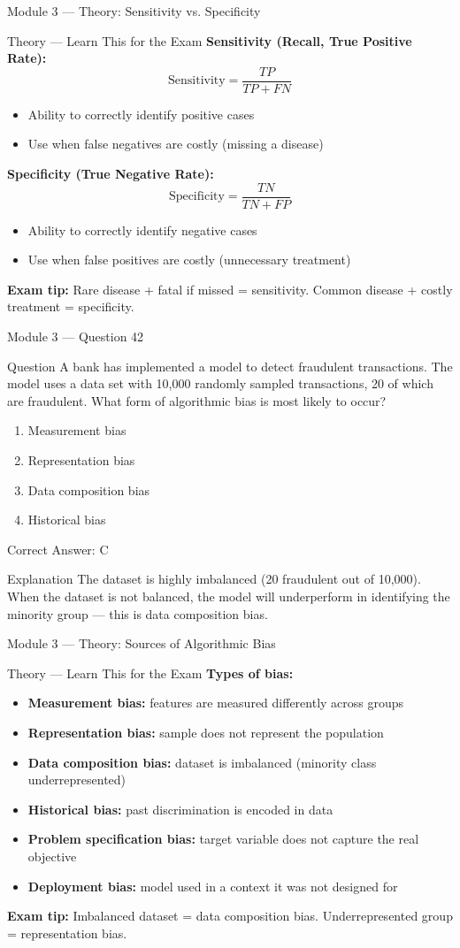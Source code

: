 \documentclass[aspectratio=169,10pt]{beamer}
\newcommand{\question}[1]{%
	\begin{block}{Question}
		#1
	\end{block}
}
\newcommand{\options}[4]{%
	\begin{enumerate}[label=\Alph*.,leftmargin=*]
		\item #1
		\item #2
		\item #3
		\item #4
	\end{enumerate}
}
\newcommand{\answerbox}[1]{%
	\begin{exampleblock}{Correct Answer: #1}
	\end{exampleblock}
}
\newcommand{\explain}[1]{%
	\begin{block}{Explanation}
		\small #1
	\end{block}
}
\newcommand{\theory}[1]{%
	\begin{block}{Theory --- Learn This for the Exam}
		\small #1
	\end{block}
}
\begin{document}
	\begin{frame}{Module 3 --- Theory: Sensitivity vs. Specificity}
		\theory{
			\textbf{Sensitivity (Recall, True Positive Rate):}
			\[
			\text{Sensitivity} = \frac{TP}{TP + FN}
			\]
			\begin{itemize}
				\item Ability to correctly identify positive cases
				\item Use when false negatives are costly (missing a disease)
			\end{itemize}
			\textbf{Specificity (True Negative Rate):}
			\[
			\text{Specificity} = \frac{TN}{TN + FP}
			\]
			\begin{itemize}
				\item Ability to correctly identify negative cases
				\item Use when false positives are costly (unnecessary treatment)
			\end{itemize}
			\textbf{Exam tip:} Rare disease + fatal if missed = sensitivity. Common disease + costly treatment = specificity.
		}
	\end{frame}
	
	\begin{frame}{Module 3 --- Question 42}
		\question{A bank has implemented a model to detect fraudulent transactions. The model uses a data set with 10,000 randomly sampled transactions, 20 of which are fraudulent. What form of algorithmic bias is most likely to occur?}
		\options{Measurement bias}{Representation bias}{Data composition bias}{Historical bias}
		\answerbox{C}
		\explain{The dataset is highly imbalanced (20 fraudulent out of 10,000). When the dataset is not balanced, the model will underperform in identifying the minority group --- this is data composition bias.}
	\end{frame}
	
	\begin{frame}{Module 3 --- Theory: Sources of Algorithmic Bias}
		\theory{
			\textbf{Types of bias:}
			\begin{itemize}
				\item \textbf{Measurement bias:} features are measured differently across groups
				\item \textbf{Representation bias:} sample does not represent the population
				\item \textbf{Data composition bias:} dataset is imbalanced (minority class underrepresented)
				\item \textbf{Historical bias:} past discrimination is encoded in data
				\item \textbf{Problem specification bias:} target variable does not capture the real objective
				\item \textbf{Deployment bias:} model used in a context it was not designed for
			\end{itemize}
			\textbf{Exam tip:} Imbalanced dataset = data composition bias. Underrepresented group = representation bias.
		}
	\end{frame}
	
\end{document}
